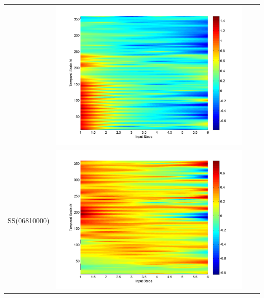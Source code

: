 \documentclass[11pt]{article}
\begin{document}
\begin{table}[H]
{\begin{tabular}{cccc}
&\begin{minipage}{.3\textwidth}\includegraphics[width=\linewidth]{resultgraph/11532500qdiff_former.png}\end{minipage}
\\
SS(06810000)
&\begin{minipage}{.3\textwidth}\includegraphics[width=\linewidth]{resultgraph/06810000pdiff_former.png}\end{minipage}

\end{tabular}}
\end{table}
\end{document}
